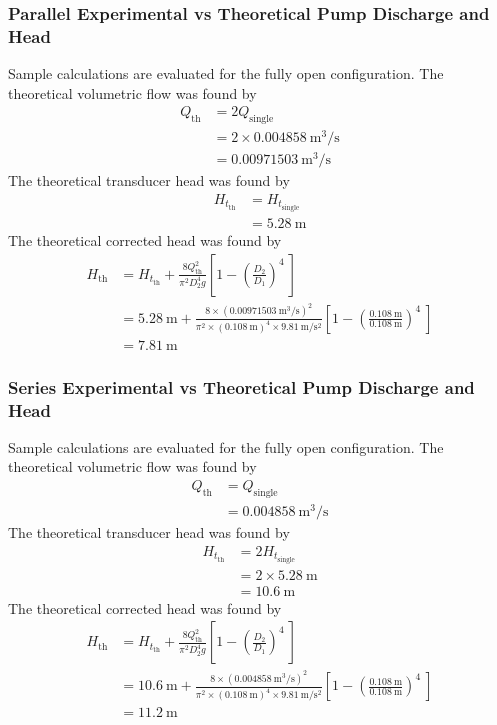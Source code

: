 \subsubsection{Parallel Experimental vs Theoretical Pump Discharge and Head}
Sample calculations are evaluated for the fully open configuration. The theoretical volumetric flow was found by
\begin{align*}
    Q_{\text{th}} &= 2 Q_{\text{single}} \\
    &= 2 \times \qty{0.004858}{\meter\cubed\per\second} \\
    &= \qty{0.00971503}{\meter\cubed\per\second}
\end{align*}
The theoretical transducer head was found by
\begin{align*}
    H_{t_{\text{th}}} &= H_{t_{\text{single}}} \\
    &= \qty{5.28}{\meter}
\end{align*}
The theoretical corrected head was found by
\begin{align*}
    H_{\text{th}} &= H_{t_{\text{th}}} + \frac{8Q_{\text{th}}^2}{\pi^2 D_2^4 g} \left[1 - \left(\frac{D_2}{D_1}\right)^4\ \right] \\
    &= \qty{5.28}{\meter} + \frac{8 \times (\qty{0.00971503}{\meter\cubed\per\second})^2}{\pi^2 \times (\qty{0.108}{\meter})^4 \times \qty{9.81}{\meter\per\second\squared}} \left[1 - \left(\frac{\qty{0.108}{\meter}}{\qty{0.108}{\meter}}\right)^4\ \right] \\
    &= \qty{7.81}{\meter}
\end{align*}

\subsubsection{Series Experimental vs Theoretical Pump Discharge and Head}
Sample calculations are evaluated for the fully open configuration. The theoretical volumetric flow was found by
\begin{align*}
    Q_{\text{th}} &= Q_{\text{single}} \\
    &= \qty{0.004858}{\meter\cubed\per\second}
\end{align*}
The theoretical transducer head was found by
\begin{align*}
    H_{t_{\text{th}}} &= 2 H_{t_{\text{single}}} \\
    &= 2 \times \qty{5.28}{\meter} \\
    &= \qty{10.6}{\meter}
\end{align*}
The theoretical corrected head was found by
\begin{align*}
    H_{\text{th}} &= H_{t_{\text{th}}} + \frac{8Q_{\text{th}}^2}{\pi^2 D_2^4 g} \left[1 - \left(\frac{D_2}{D_1}\right)^4\ \right] \\
    &= \qty{10.6}{\meter} + \frac{8 \times (\qty{0.004858}{\meter\cubed\per\second})^2}{\pi^2 \times (\qty{0.108}{\meter})^4 \times \qty{9.81}{\meter\per\second\squared}} \left[1 - \left(\frac{\qty{0.108}{\meter}}{\qty{0.108}{\meter}}\right)^4\ \right] \\
    &= \qty{11.2}{\meter}
\end{align*}

